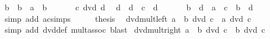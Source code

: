 \begin{isabellebody}
\ b{\isacharprime}{\kern0pt}\ \ {\isachardoublequoteopen}b\ {\isacharequal}{\kern0pt}\ a\ {\isacharasterisk}{\kern0pt}\ b{\isacharprime}{\kern0pt}{\isachardoublequoteclose}\ \isacommand{{\isachardot}{\kern0pt}{\isachardot}{\kern0pt}}\isamarkupfalse%
\isanewline
\ \ \isamarkupfalse%
\ \isamarkupfalse%
\ {\isacartoucheopen}c\ dvd\ d{\isacartoucheclose}\ \isamarkupfalse%
\ d{\isacharprime}{\kern0pt}\ \ {\isachardoublequoteopen}d\ {\isacharequal}{\kern0pt}\ c\ {\isacharasterisk}{\kern0pt}\ d{\isacharprime}{\kern0pt}{\isachardoublequoteclose}\ \isacommand{{\isachardot}{\kern0pt}{\isachardot}{\kern0pt}}\isamarkupfalse%
\isanewline
\ \ \isamarkupfalse%
\ \isamarkupfalse%
\ {\isachardoublequoteopen}b\ {\isacharasterisk}{\kern0pt}\ d\ {\isacharequal}{\kern0pt}\ {\isacharparenleft}{\kern0pt}a\ {\isacharasterisk}{\kern0pt}\ c{\isacharparenright}{\kern0pt}\ {\isacharasterisk}{\kern0pt}\ {\isacharparenleft}{\kern0pt}b{\isacharprime}{\kern0pt}\ {\isacharasterisk}{\kern0pt}\ d{\isacharprime}{\kern0pt}{\isacharparenright}{\kern0pt}{\isachardoublequoteclose}\isanewline
\ \ \ \ \isamarkupfalse%
\ {\isacharparenleft}{\kern0pt}simp\ add{\isacharcolon}{\kern0pt}\ ac{\isacharunderscore}{\kern0pt}simps{\isacharparenright}{\kern0pt}\isanewline
\ \ \isamarkupfalse%
\ \isamarkupfalse%
\ {\isacharquery}{\kern0pt}thesis\ \isacommand{{\isachardot}{\kern0pt}{\isachardot}{\kern0pt}}\isamarkupfalse%
\isanewline
{}\isamarkupfalse%
%
\endisatagproof
{\isafoldproof}%
%
\isadelimproof
\isanewline
%
\endisadelimproof
\isanewline
{}\isamarkupfalse%
\ dvd{\isacharunderscore}{\kern0pt}mult{\isacharunderscore}{\kern0pt}left{\isacharcolon}{\kern0pt}\ {\isachardoublequoteopen}a\ {\isacharasterisk}{\kern0pt}\ b\ dvd\ c\ {\isasymLongrightarrow}\ a\ dvd\ c{\isachardoublequoteclose}\isanewline
%
\isadelimproof
\ \ %
\endisadelimproof
%
\isatagproof
{}\isamarkupfalse%
\ {\isacharparenleft}{\kern0pt}simp\ add{\isacharcolon}{\kern0pt}\ dvd{\isacharunderscore}{\kern0pt}def\ mult{\isachardot}{\kern0pt}assoc{\isacharparenright}{\kern0pt}\ blast%
\endisatagproof
{\isafoldproof}%
%
\isadelimproof
\isanewline
%
\endisadelimproof
\isanewline
{}\isamarkupfalse%
\ dvd{\isacharunderscore}{\kern0pt}mult{\isacharunderscore}{\kern0pt}right{\isacharcolon}{\kern0pt}\ {\isachardoublequoteopen}a\ {\isacharasterisk}{\kern0pt}\ b\ dvd\ c\ {\isasymLongrightarrow}\ b\ dvd\ c{\isachardoublequoteclose}\isanewline

\end{isabellebody}
